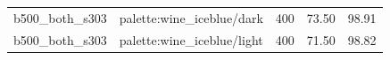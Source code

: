 \begin{longtable}{l>{\raggedright\arraybackslash}p{.42\linewidth}rrr}
b500\_\allowbreak{}both\_\allowbreak{}s303 & %
palette:wine\_\allowbreak{}iceblue/dark & %
400 & %
73.50 & %
98.91 \\ %

b500\_\allowbreak{}both\_\allowbreak{}s303 & %
palette:wine\_\allowbreak{}iceblue/light & %
400 & %
71.50 & %
98.82 \\ %


\end{longtable}
